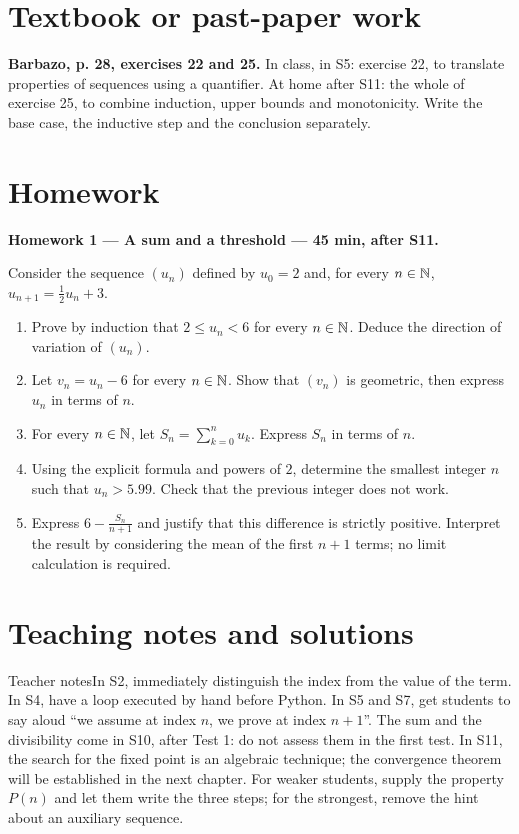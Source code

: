 \section{Textbook or past-paper work}\textbf{Barbazo, p. 28, exercises 22 and 25.} In class, in S5: exercise 22, to translate properties of sequences using a quantifier. At home after S11: the whole of exercise 25, to combine induction, upper bounds and monotonicity. Write the base case, the inductive step and the conclusion separately.

\section{Homework}\textbf{Homework 1 --- A sum and a threshold --- 45 min, after S11.}\par Consider the sequence $(u_n)$ defined by $u_0=2$ and, for every $n\in\mathbb N$, $u_{n+1}=\frac12u_n+3$.
\begin{enumerate}\item Prove by induction that $2\le u_n<6$ for every $n\in\mathbb N$. Deduce the direction of variation of $(u_n)$.
\item Let $v_n=u_n-6$ for every $n\in\mathbb N$. Show that $(v_n)$ is geometric, then express $u_n$ in terms of $n$.
\item For every $n\in\mathbb N$, let $S_n=\displaystyle\sum_{k=0}^n u_k$. Express $S_n$ in terms of $n$.
\item Using the explicit formula and powers of $2$, determine the smallest integer $n$ such that $u_n>5.99$. Check that the previous integer does not work.
\item Express $6-\frac{S_n}{n+1}$ and justify that this difference is strictly positive. Interpret the result by considering the mean of the first $n+1$ terms; no limit calculation is required.\end{enumerate}

\ifprof\clearpage\section{Teaching notes and solutions}\begin{profbox}{Teacher notes}In S2, immediately distinguish the index from the value of the term. In S4, have a loop executed by hand before Python. In S5 and S7, get students to say aloud ``we assume at index $n$, we prove at index $n+1$''. The sum and the divisibility come in S10, after Test 1: do not assess them in the first test. In S11, the search for the fixed point is an algebraic technique; the convergence theorem will be established in the next chapter. For weaker students, supply the property $P(n)$ and let them write the three steps; for the strongest, remove the hint about an auxiliary sequence.\end{profbox}

